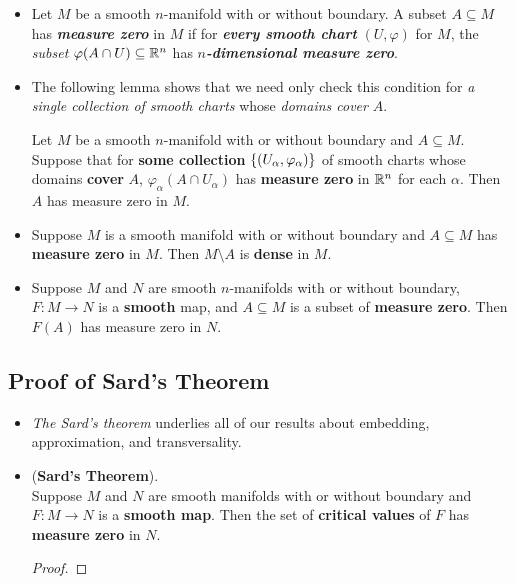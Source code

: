 \documentclass[11pt]{article}
\begin{document}
\begin{itemize}
\item \begin{definition}
Let $M$ be a smooth $n$-manifold with or without boundary. A subset $A \subseteq M$ has \emph{\textbf{measure zero}} in $M$ if for \emph{\textbf{every smooth chart}} $(U, \varphi)$ for $M$, the \emph{subset} $\varphi(A \cap U ) \subseteq  {\mathbb R}^n$ has \emph{\textbf{$n$-dimensional measure zero}}. 
\end{definition}

\item The following lemma shows that we need only check this condition for \emph{a single collection of smooth charts} whose \emph{domains cover} $A$. 
\begin{lemma}
Let $M$ be a smooth $n$-manifold with or without boundary and $A \subseteq M$. Suppose that for \textbf{some collection} $\left\{(U_{\alpha}, \varphi_{\alpha})\right\}$ of smooth charts whose domains \textbf{cover} $A$, $\varphi_{\alpha}(A \cap U_{\alpha})$ has \textbf{measure zero} in ${\mathbb R}^n$ for each $\alpha$. Then $A$ has measure zero in $M$.
\end{lemma}

\item \begin{proposition}
Suppose $M$ is a smooth manifold with or without boundary and $A \subseteq M$ has \textbf{measure zero} in $M$. Then $M \setminus A$ is \textbf{dense} in $M$.
\end{proposition}

\item \begin{theorem}
Suppose $M$ and $N$ are smooth $n$-manifolds with or without boundary, $F: M \rightarrow N$ is a \textbf{smooth} map, and $A \subseteq M$ is a subset of \textbf{measure zero}. Then $F(A)$ has measure zero in $N$.
\end{theorem}
\end{itemize}
\subsection{Proof of Sard's Theorem}
\begin{itemize}
\item \emph{The Sard's theorem} underlies all of our results about embedding, approximation, and transversality.

\item \begin{theorem}(\textbf{Sard's Theorem}). \\
Suppose $M$ and $N$ are smooth manifolds with or without boundary and $F: M \rightarrow N$ is a \textbf{smooth map}. Then the set of \textbf{critical
values} of $F$ has \textbf{measure zero} in $N$.
\end{theorem}
\begin{proof}

\end{proof}
\end{itemize}
\end{document}
